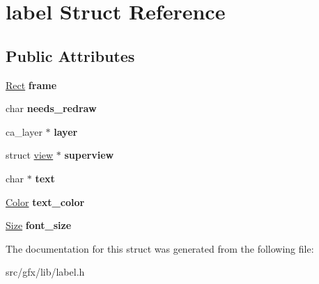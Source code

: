 \hypertarget{structlabel}{}\section{label Struct Reference}
\label{structlabel}
\subsection*{Public Attributes}
\begin{DoxyCompactItemize}
\item 
\mbox{\label{structlabel_a02f25e596c19a70aa9da5b8abae0743e}} 
\hyperlink{structrect}{Rect} {\bfseries frame}
\item 
\mbox{\label{structlabel_a272abbfffd3ecfc18ad12baf52e025d1}} 
char {\bfseries needs\+\_\+redraw}
\item 
\mbox{\label{structlabel_aa44c5935bc350ea795379fbc34f4c20b}} 
ca\+\_\+layer $\ast$ {\bfseries layer}
\item 
\mbox{\label{structlabel_a7a9e2fb1dc94a66ae60d414d1a9603be}} 
struct \hyperlink{structview}{view} $\ast$ {\bfseries superview}
\item 
\mbox{\label{structlabel_a70761e55d9fd66bab0cb2d2de7847707}} 
char $\ast$ {\bfseries text}
\item 
\mbox{\label{structlabel_a42cc0c695a5ebb51ebf8d168380f78ce}} 
\hyperlink{structcolor}{Color} {\bfseries text\+\_\+color}
\item 
\mbox{\label{structlabel_ae29a289a349e5444c84bfbb2617e6e75}} 
\hyperlink{structsize}{Size} {\bfseries font\+\_\+size}
\end{DoxyCompactItemize}


The documentation for this struct was generated from the following file\+:\begin{DoxyCompactItemize}
\item 
src/gfx/lib/label.\+h\end{DoxyCompactItemize}
